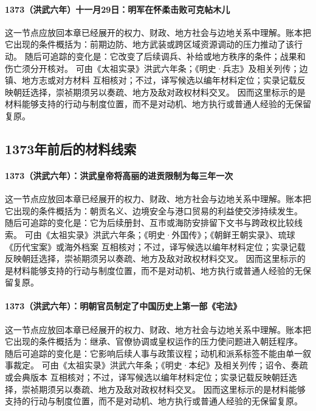 \paragraph{1373（洪武六年）十一月29日：明军在怀柔击败可克帖木儿} 这一节点应放回本章已经展开的权力、财政、地方社会与边地关系中理解。账本把它出现的条件概括为：前期边防、地方武装或跨区域资源调动的压力推动了该行动。 随后可追踪的变化是：它改变了后续调兵、补给或地方秩序的条件；战果和伤亡须分开核对。 可由《太祖实录》洪武六年条；《明史·兵志》及相关列传；边镇、地方志或对方材料 互相核对；不过，译写候选以编年材料定位；实录记载反映朝廷选择，崇祯期须另以奏疏、地方及敌对政权材料交叉。 因而这里标示的是材料能够支持的行动与制度位置，而不是对动机、地方执行或普通人经验的无保留复原。

\subsection{1373年前后的材料线索}

\paragraph{1373（洪武六年）：洪武皇帝将高丽的进贡限制为每三年一次} 这一节点应放回本章已经展开的权力、财政、地方社会与边地关系中理解。账本把它出现的条件概括为：朝贡名义、边境安全与港口贸易的利益使交涉持续发生。 随后可追踪的变化是：它为后续册封、互市或海防安排留下文书与跨政权比较线索。 可由《太祖实录》洪武六年条；《明史·外国传》；《朝鲜王朝实录》、琉球《历代宝案》或海外档案 互相核对；不过，译写候选以编年材料定位；实录记载反映朝廷选择，崇祯期须另以奏疏、地方及敌对政权材料交叉。 因而这里标示的是材料能够支持的行动与制度位置，而不是对动机、地方执行或普通人经验的无保留复原。

\paragraph{1373（洪武六年）：明朝官员制定了中国历史上第一部《宅法》} 这一节点应放回本章已经展开的权力、财政、地方社会与边地关系中理解。账本把它出现的条件概括为：继承、官僚协调或皇权运作的压力使问题进入朝廷程序。 随后可追踪的变化是：它影响后续人事与政策议程；动机和派系标签不能由单一叙事裁定。 可由《太祖实录》洪武六年条；《明史·本纪》及相关列传；诏令、奏疏或会典版本 互相核对；不过，译写候选以编年材料定位；实录记载反映朝廷选择，崇祯期须另以奏疏、地方及敌对政权材料交叉。 因而这里标示的是材料能够支持的行动与制度位置，而不是对动机、地方执行或普通人经验的无保留复原。

